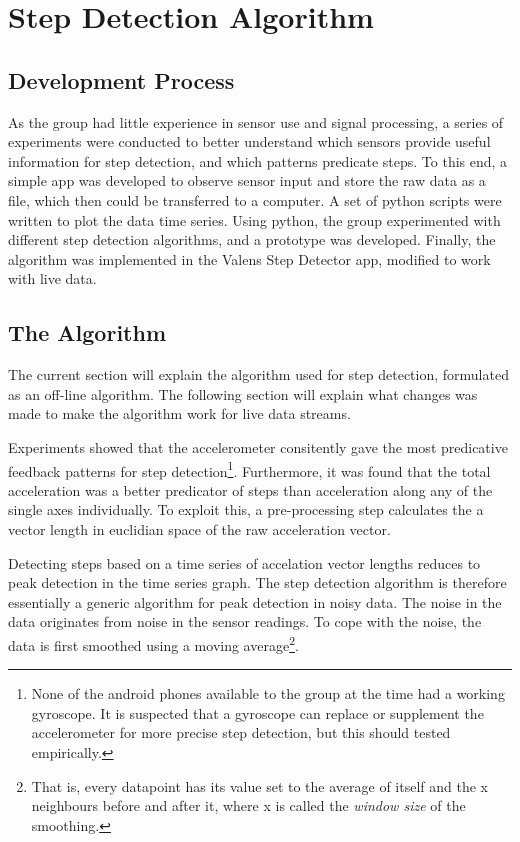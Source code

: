 \chapter{Step Detection Algorithm}

\section{Development Process}
As the group had little experience in sensor use and signal processing, a series of experiments were conducted to better understand which sensors provide useful information for step detection, and which patterns predicate steps. To this end, a simple app was developed to observe sensor input and store the raw data as a file, which then could be transferred to a computer. A set of python scripts were written to plot  the data time series. Using python, the group experimented with different step detection algorithms, and a prototype was developed. Finally, the algorithm was implemented in the Valens Step Detector app, modified to work with live data.

\section{The Algorithm}
The current section will explain the algorithm used for step detection, formulated as an off-line algorithm. The following section will explain what changes was made to make the algorithm work for live data streams.

Experiments showed that the accelerometer consitently gave the most predicative feedback patterns for step detection\footnote{None of the android phones available to the group at the time had a working gyroscope. It is suspected that a gyroscope can replace or supplement the accelerometer for more precise step detection, but this should tested empirically.}. Furthermore, it was found that the total acceleration was a better predicator of steps than acceleration along any of the single axes individually. To exploit this, a pre-processing step calculates the a vector length in euclidian space of the raw acceleration vector.

Detecting steps based on a time series of accelation vector lengths reduces to peak detection in the time series graph. The step detection algorithm is therefore essentially a generic algorithm for peak detection in noisy data. The noise in the data originates from noise in the sensor readings. To cope with the noise, the data is first smoothed using a moving average\footnote{That is, every datapoint has its value set to the average of itself and the x neighbours before and after it, where x is called the \emph{window size} of the smoothing.}.

